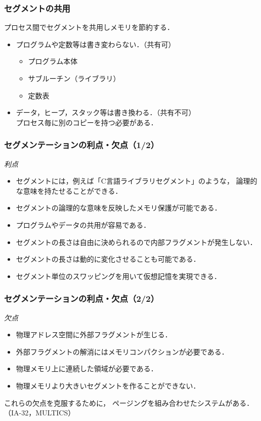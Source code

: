 \documentclass[unicode,handout]{beamer}                   %
\begin{document}
\begin{frame}
  \frametitle{セグメントの共用}
  プロセス間でセグメントを共用しメモリを節約する．
  \begin{itemize}
    \item プログラムや定数等は書き変わらない．（共有可）
      \begin{itemize}
      \item プログラム本体
      \item サブルーチン（ライブラリ）
      \item 定数表
      \end{itemize}
    \item データ，ヒープ，スタック等は書き換わる．（共有不可）\\
      プロセス毎に別のコピーを持つ必要がある．
  \end{itemize}
\end{frame}

\begin{frame}
\end{frame}

\begin{frame}
  \frametitle{セグメンテーションの利点・欠点（1/2）}
  \emph{利点}
  \begin{itemize}
  \item セグメントには，例えば「C言語ライブラリセグメント」のような，
    論理的な意味を持たせることができる．
  \item セグメントの論理的な意味を反映したメモリ保護が可能である．
  \item プログラムやデータの共用が容易である．
  \item セグメントの長さは自由に決められるので内部フラグメントが発生しない．
  \item セグメントの長さは動的に変化させることも可能である．
  \item セグメント単位のスワッピングを用いて仮想記憶を実現できる．
  \end{itemize}
\end{frame}

\begin{frame}
  \frametitle{セグメンテーションの利点・欠点（2/2）}
  \emph{欠点}
  \begin{itemize}
  \item 物理アドレス空間に外部フラグメントが生じる．
  \item 外部フラグメントの解消にはメモリコンパクションが必要である．
  \item 物理メモリ上に連続した領域が必要である．
  \item 物理メモリより大きいセグメントを作ることができない．
  \end{itemize}

  これらの欠点を克服するために，
  ページングを組み合わせたシステムがある．
  （IA-32，MULTICS）
\end{frame}
\end{document}
